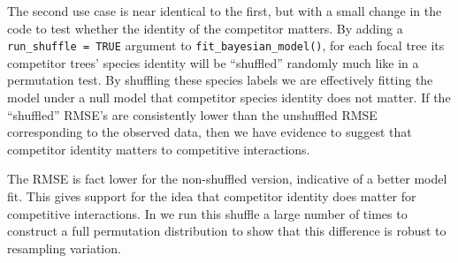\documentclass[12pt]{article}
\newenvironment{Shaded}{\begin{snugshade}}{\end{snugshade}}
\newcommand{\CommentTok}[1]{\textcolor[rgb]{0.56,0.35,0.01}{\textit{#1}}}
\newcommand{\DataTypeTok}[1]{\textcolor[rgb]{0.13,0.29,0.53}{#1}}
\newcommand{\KeywordTok}[1]{\textcolor[rgb]{0.13,0.29,0.53}{\textbf{#1}}}
\newcommand{\NormalTok}[1]{#1}
\newcommand{\OperatorTok}[1]{\textcolor[rgb]{0.81,0.36,0.00}{\textbf{#1}}}
\newcommand{\OtherTok}[1]{\textcolor[rgb]{0.56,0.35,0.01}{#1}}
\newcommand{\StringTok}[1]{\textcolor[rgb]{0.31,0.60,0.02}{#1}}
\begin{document}
The second use case is near identical to the first, but with a small
change in the code to test whether the identity of the competitor
matters. By adding a \texttt{run\_shuffle\ =\ TRUE} argument to
\texttt{fit\_bayesian\_model()}, for each focal tree its competitor
trees' species identity will be ``shuffled'' randomly much like in a
permutation test. By shuffling these species labels we are effectively
fitting the model under a null model that competitor species identity
does not matter. If the ``shuffled'' RMSE's are consistently lower than
the unshuffled RMSE corresponding to the observed data, then we have
evidence to suggest that competitor identity matters to competitive
interactions.

\begin{Shaded}
\end{Shaded}

\begin{Shaded}
\end{Shaded}

\begin{Shaded}
\end{Shaded}

The RMSE is fact lower for the non-shuffled version, indicative of a
better model fit. This gives support for the idea that competitor
identity does matter for competitive interactions. In
\citet{allen_permutation_2020} we run this shuffle a large number of
times to construct a full permutation distribution to show that this
difference is robust to resampling variation.
\end{document}
